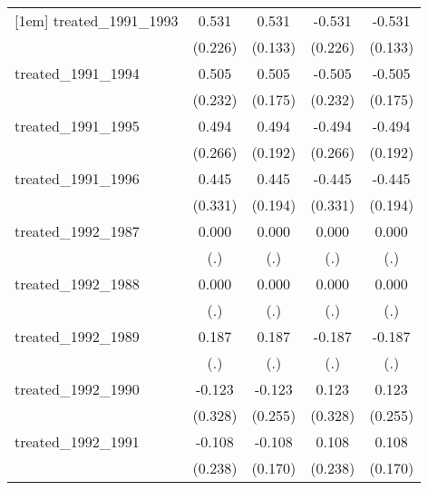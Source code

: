 {\begin{tabular}{l*{4}{c}}
[1em]
treated\_1991\_1993&       0.531\sym{*}  &       0.531\sym{***}&      -0.531\sym{*}  &      -0.531\sym{***}\\
            &     (0.226)         &     (0.133)         &     (0.226)         &     (0.133)         \\
[1em]
treated\_1991\_1994&       0.505\sym{*}  &       0.505\sym{**} &      -0.505\sym{*}  &      -0.505\sym{**} \\
            &     (0.232)         &     (0.175)         &     (0.232)         &     (0.175)         \\
[1em]
treated\_1991\_1995&       0.494         &       0.494\sym{**} &      -0.494         &      -0.494\sym{**} \\
            &     (0.266)         &     (0.192)         &     (0.266)         &     (0.192)         \\
[1em]
treated\_1991\_1996&       0.445         &       0.445\sym{*}  &      -0.445         &      -0.445\sym{*}  \\
            &     (0.331)         &     (0.194)         &     (0.331)         &     (0.194)         \\
[1em]
treated\_1992\_1987&       0.000         &       0.000         &       0.000         &       0.000         \\
            &         (.)         &         (.)         &         (.)         &         (.)         \\
[1em]
treated\_1992\_1988&       0.000         &       0.000         &       0.000         &       0.000         \\
            &         (.)         &         (.)         &         (.)         &         (.)         \\
[1em]
treated\_1992\_1989&       0.187         &       0.187         &      -0.187         &      -0.187         \\
            &         (.)         &         (.)         &         (.)         &         (.)         \\
[1em]
treated\_1992\_1990&      -0.123         &      -0.123         &       0.123         &       0.123         \\
            &     (0.328)         &     (0.255)         &     (0.328)         &     (0.255)         \\
[1em]
treated\_1992\_1991&      -0.108         &      -0.108         &       0.108         &       0.108         \\
            &     (0.238)         &     (0.170)         &     (0.238)         &     (0.170)         \\

\end{tabular}}
